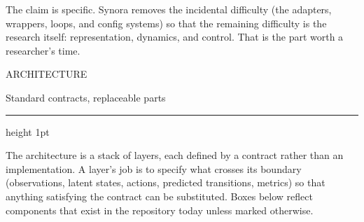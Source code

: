 \documentclass[10pt,a4paper]{article}
\newcommand{\kicker}[1]{{\footnotesize\displayfont\color{accent}\MakeUppercase{#1}}}
\newcommand{\pagetitle}[2]{%
  \kicker{#1}\par\vspace{1.5mm}
  {\Huge\displayfont\color{ink} #2}\par\vspace{2.5mm}
  {\color{rule}\hrule height 1pt}\par\vspace{4mm}}
\begin{document}
\vspace{3mm}
{\footnotesize
The claim is specific. Synora removes the incidental difficulty (the adapters, wrappers, loops,
and config systems) so that the remaining difficulty is the research itself: representation,
dynamics, and control. That is the part worth a researcher's time.}

\newpage
\pagetitle{Architecture}{Standard contracts, replaceable parts}

{\footnotesize
The architecture is a stack of layers, each defined by a contract rather than an implementation.
A layer's job is to specify what crosses its boundary (observations, latent states, actions,
predicted transitions, metrics) so that anything satisfying the contract can be substituted.
Boxes below reflect components that exist in the repository today unless marked otherwise.}

\vspace{3.5mm}
\end{document}
